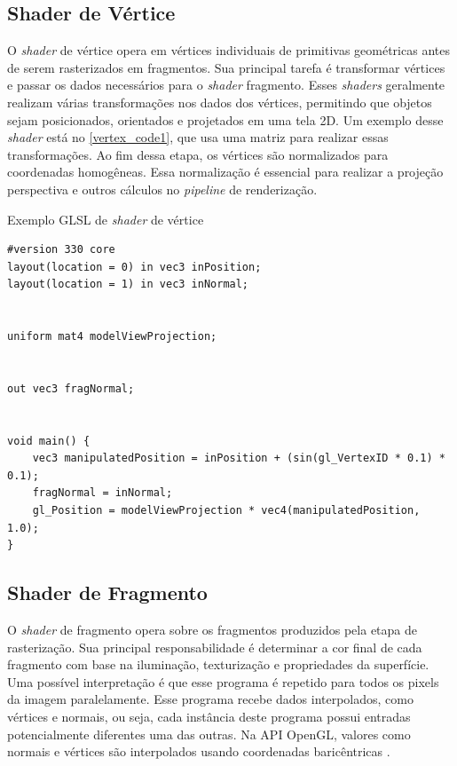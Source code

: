 \documentclass[english, 
               brazil, 
               bsc] %
               {dcomp-abntex2}
\begin{document}
\subsection{Shader de Vértice}


O \textit{shader} de vértice opera em vértices individuais de primitivas geométricas antes de serem rasterizados em fragmentos. Sua principal tarefa é transformar vértices e passar os dados necessários para o \textit{shader} fragmento. Esses \textit{shaders} geralmente realizam várias transformações nos dados dos vértices, permitindo que objetos sejam posicionados, orientados e projetados em uma tela 2D. Um exemplo desse \textit{shader} está no \autoref{vertex_code1}, que usa uma matriz para realizar essas transformações. Ao fim dessa etapa, os vértices são normalizados para coordenadas homogêneas. Essa normalização é essencial para realizar a projeção perspectiva e outros cálculos no \textit{pipeline} de renderização.




\begin{codigo}[H]
  \caption{Exemplo GLSL de \textit{shader} de vértice}
 \label{vertex_code1}
\begin{lstlisting}
#version 330 core
layout(location = 0) in vec3 inPosition;
layout(location = 1) in vec3 inNormal;


uniform mat4 modelViewProjection;


out vec3 fragNormal;


void main() {
    vec3 manipulatedPosition = inPosition + (sin(gl_VertexID * 0.1) * 0.1);
    fragNormal = inNormal;
    gl_Position = modelViewProjection * vec4(manipulatedPosition, 1.0);
}
\end{lstlisting}
\end{codigo}


\subsection{Shader de Fragmento}


O \textit{shader} de fragmento opera sobre os fragmentos produzidos pela etapa de rasterização. Sua principal responsabilidade é determinar a cor final de cada fragmento com base na iluminação, texturização e propriedades da superfície. Uma possível interpretação é que esse programa é repetido para todos os pixels da imagem paralelamente.  Esse programa recebe dados interpolados, como vértices e normais, ou seja, cada instância deste programa possui entradas potencialmente diferentes uma das outras. Na API OpenGL, valores como normais e vértices são interpolados usando coordenadas baricêntricas \cite{opengl_interpolation}.
\end{document}
